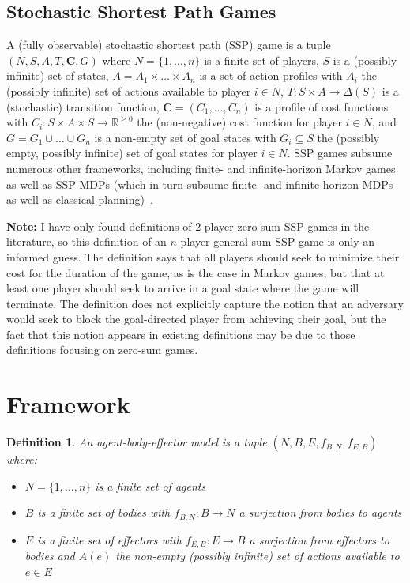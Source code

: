 \documentclass[10pt]{article}
\theoremstyle{plain}
\newtheorem{definition}{Definition}
\newcommand{\vect}[1]{\bm{#1}}
\newenvironment{note}[1][Note]{
    \begin{center}
    	\begin{minipage}{0.9\linewidth}
    		\begin{mdframed}[backgroundcolor=yellow!25,linewidth=0pt]
    			\textbf{#1:} }{
    		\end{mdframed}
    	\end{minipage}
    \end{center}
}
\begin{document}
\subsection{Stochastic Shortest Path Games}
A (fully observable) stochastic shortest path (SSP) game is a tuple $(N, S, A, T, \vect{C}, G)$ where
$N = \{ 1, \dots, n \}$ is a finite set of players,
$S$ is a (possibly infinite) set of states,
$A = A_{1} \times \dots \times A_{n}$ is a set of action profiles with $A_{i}$ the (possibly infinite) set of actions available to player $i \in N$,
$T : S \times A \to \Delta(S)$ is a (stochastic) transition function,
$\vect{C} = (C_{1}, \dots, C_{n})$ is a profile of cost functions with $C_{i} : S \times A \times S \to \mathbb{R}^{\ge 0}$ the (non-negative) cost function for player $i \in N$,
and $G = G_{1} \cup \dots \cup G_{n}$ is a non-empty set of goal states with $G_{i} \subseteq S$ the (possibly empty, possibly infinite) set of goal states for player $i \in N$.
SSP games subsume numerous other frameworks, including finite- and infinite-horizon Markov games as well as SSP MDPs (which in turn subsume finite- and infinite-horizon MDPs as well as classical planning)~\cite{Bertsekas:book:1995,Patek:PhD:1997,Patek:JCO:1999,Kolobov:book:2012}.

\begin{note}
    I have only found definitions of $2$-player zero-sum SSP games in the literature, so this definition of an $n$-player general-sum SSP game is only an informed guess.
    The definition says that all players should seek to minimize their cost for the duration of the game, as is the case in Markov games, but that at least one player should seek to arrive in a goal state where the game will terminate.
    The definition does not explicitly capture the notion that an adversary would seek to block the goal-directed player from achieving their goal, but the fact that this notion appears in existing definitions may be due to those definitions focusing on zero-sum games.
\end{note}

\newpage
\section{Framework}\label{section:framework}

\begin{definition}\label{definition:model}
    An agent-body-effector model is a tuple $(N, B, E, f_{B,N}, f_{E,B})$ where:
    \begin{itemize}
        \item $N = \{ 1, \dots, n \}$ is a finite set of agents
        \item $B$ is a finite set of bodies with $f_{B,N} : B \to N$ a surjection from bodies to agents
        \item $E$ is a finite set of effectors with $f_{E,B} : E \to B$ a surjection from effectors to bodies and $A(e)$ the non-empty (possibly infinite) set of actions available to $e \in E$
    \end{itemize}
\end{definition}
\end{document}
